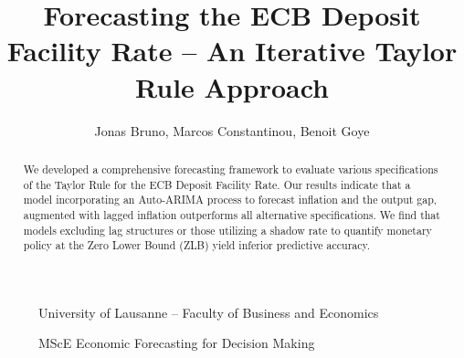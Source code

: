 \documentclass[a4,10pt]{article}
\title{Forecasting the ECB Deposit Facility Rate -- An Iterative Taylor Rule Approach}
\author{Jonas Bruno, Marcos Constantinou, Benoit Goye}
\begin{document}
\maketitle

\begin{abstract}
We developed a comprehensive forecasting framework to evaluate various specifications of the Taylor Rule for the ECB Deposit Facility Rate. Our results indicate that a model incorporating an Auto-ARIMA process to forecast inflation and the output gap, augmented with lagged inflation outperforms all alternative specifications. We find that models excluding lag structures or those utilizing a shadow rate to quantify monetary policy at the Zero Lower Bound (ZLB) yield inferior predictive accuracy.

\end{abstract}

\begin{figure}[b]
    \centering
    University of Lausanne -- Faculty of Business and Economics
    
    \noindent MScE Economic Forecasting for Decision Making 

\end{figure}


\newpage

\tableofcontents
\listoftables
\listoffigures


\newpage















\end{document}

